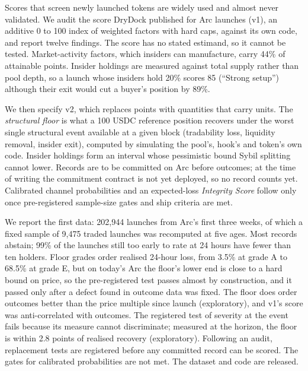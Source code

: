 Scores that screen newly launched tokens are widely used and almost never validated. We audit the score DryDock published for Arc launches (v1), an additive 0 to 100 index of weighted factors with hard caps, against its own code, and report twelve findings. The score has no stated estimand, so it cannot be tested. Market-activity factors, which insiders can manufacture, carry 44\% of attainable points. Insider holdings are measured against total supply rather than pool depth, so a launch whose insiders hold 20\% scores 85 (``Strong setup'') although their exit would cut a buyer's position by 89\%.

We then specify v2, which replaces points with quantities that carry units. The \emph{structural floor} is what a 100 USDC reference position recovers under the worst single structural event available at a given block (tradability loss, liquidity removal, insider exit), computed by simulating the pool's, hook's and token's own code. Insider holdings form an interval whose pessimistic bound Sybil splitting cannot lower. Records are to be committed on Arc before outcomes; at the time of writing the commitment contract is not yet deployed, so no record counts yet. Calibrated channel probabilities and an expected-loss \emph{Integrity Score} follow only once pre-registered sample-size gates and ship criteria are met.

We report the first data: 202,944 launches from Arc's first three weeks, of which a fixed sample of 9,475 traded launches was recomputed at five ages. Most records abstain; 99\% of the launches still too early to rate at 24 hours have fewer than ten holders. Floor grades order realised 24-hour loss, from 3.5\% at grade A to 68.5\% at grade E, but on today's Arc the floor's lower end is close to a hard bound on price, so the pre-registered test passes almost by construction, and it passed only after a defect found in outcome data was fixed. The floor does order outcomes better than the price multiple since launch (exploratory), and v1's score was anti-correlated with outcomes. The registered test of severity at the event fails because its measure cannot discriminate; measured at the horizon, the floor is within 2.8 points of realised recovery (exploratory). Following an audit, replacement tests are registered before any committed record can be scored. The gates for calibrated probabilities are not met. The dataset and code are released.
